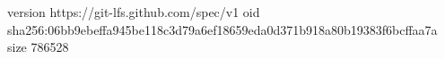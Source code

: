 version https://git-lfs.github.com/spec/v1
oid sha256:06bb9ebeffa945be118c3d79a6ef18659eda0d371b918a80b19383f6bcffaa7a
size 786528
